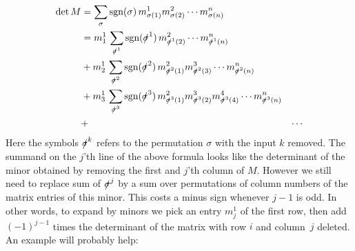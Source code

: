 \begin{align*}
\det M &=\sum_{\sigma} \text{sgn}(\sigma)\, m^1_{\sigma(1)}m^2_{\sigma(2)}\cdots m^n_{\sigma(n)} \\
&=m^1_1\, \sum_{\slashed{\sigma}^1} \text{sgn}(\slashed{\sigma}^1)\, m^2_{\slashed{\sigma}^1(2)}\cdots m^n_{\slashed{\sigma}^1(n)} \\
& + m^1_2\, \sum_{\slashed{\sigma}^2} \text{sgn}(\slashed{\sigma}^2)\, m^2_{\slashed{\sigma}^2(1)}
m^3_{\slashed{\sigma}^2(3)}\cdots m^n_{\slashed{\sigma}^2(n)} \\
& + m^1_3\,  \sum_{\slashed{\sigma}^3} \text{sgn}(\slashed{\sigma}^3)\, m^2_{\slashed{\sigma}^3(1)}m^3_{\slashed{\sigma}^3(2)}m^4_{\slashed{\sigma}^3(4)}\cdots m^n_{\slashed{\sigma}^3(n)}\\ &+& \cdots
\end{align*}
Here the symbols $\slashed{\sigma}^k$ 
refers to the permutation $\sigma$ with the input $k$ removed.
The summand on  the $j$'th line of the above formula looks like the determinant of the minor obtained by removing the first  and $j$'th column of $M$. However we still need to  replace sum of $\slashed{\sigma}^j$ by a sum over permutations of  column numbers of the matrix entries of this minor. This costs a minus sign whenever $j-1$ is odd.
In other words, to expand by minors we pick an entry $m^1_j$ of the first row, then add $(-1)^{j-1}$ times the determinant of the matrix with row $i$ and column~$j$ deleted. An example will probably help:


